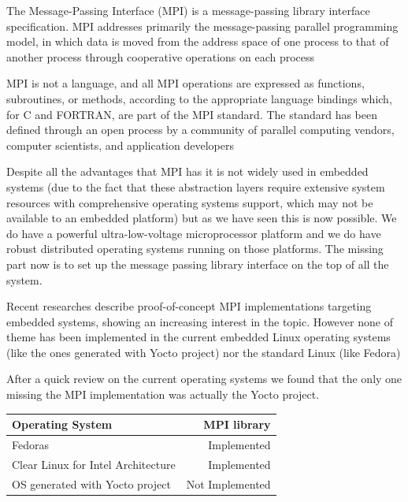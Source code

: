 The Message-Passing Interface (MPI) is a message-passing library interface
specification. MPI addresses primarily the message-passing parallel programming
model, in which data is moved from the address space of one process to that of
another process through cooperative operations on each process

MPI is not a language, and all MPI operations are expressed as functions,
subroutines, or methods, according to the appropriate language bindings which,
for C and FORTRAN, are part of the MPI standard. The standard has been defined
through an open process by a community of parallel computing vendors, computer
scientists, and application developers

Despite all the advantages that MPI has it is not widely used in embedded
systems (due to the fact that these abstraction layers require extensive
system resources with comprehensive operating systems support, which may not be
available to an embedded platform) but as we have seen this is now possible. We
do have a powerful ultra-low-voltage microprocessor platform
\cite{minnowboard} and we do have robust distributed operating systems running on
those platforms. The missing part now is to set up the message passing library
interface on the top of all the system. 

Recent researches \cite{Saldana} \cite{Gallego} \cite{McMahon} describe
proof-of-concept MPI implementations targeting embedded systems, showing an
increasing interest in the topic. However none of theme has been implemented in
the current embedded Linux operating systems (like the ones generated with
Yocto project\cite{yocto-project}) nor the standard Linux (like
Fedora\cite{fedora})

After a quick review on the current operating systems we found that the only
one missing the MPI implementation was actually the Yocto project.


\begin{center}
\begin{tabular}{ | l | r |}
    \hline
    Operating System & MPI library  \\ \hline
    Fedoras & Implemented  \\ \hline
    Clear Linux for Intel Architecture & Implemented  \\ \hline
    OS generated with Yocto project & Not Implemented  \\ \hline
\end{tabular}
\label{tab:4.2}
\end{center}



